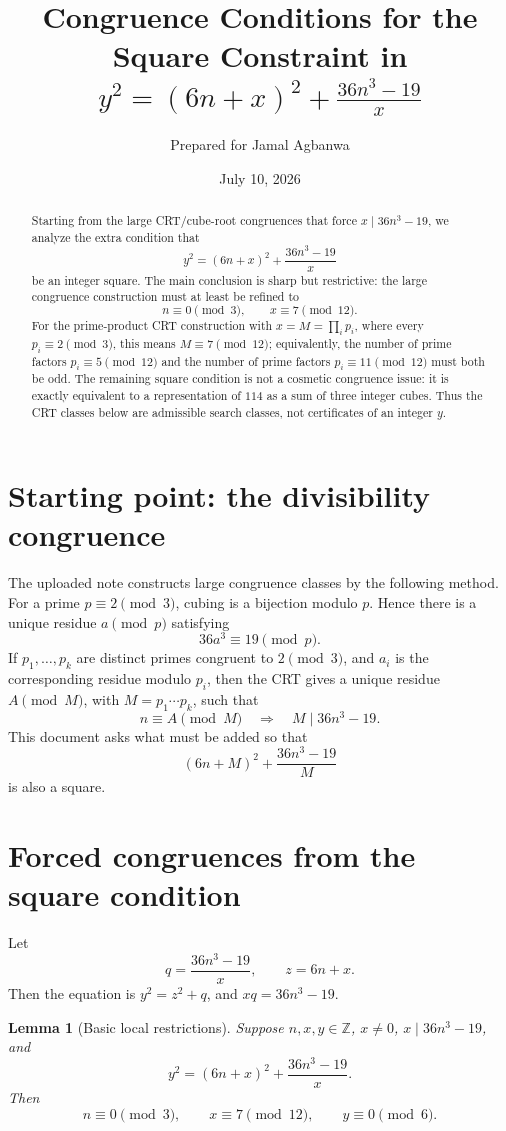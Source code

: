 \documentclass[11pt]{article}
\title{Congruence Conditions for the Square Constraint in\\
\texorpdfstring{$\displaystyle y^2=(6n+x)^2+\frac{36n^3-19}{x}$}{y2=(6n+x)2+(36n3-19)/x}}
\author{Prepared for Jamal Agbanwa}
\date{July 10, 2026}
\newtheorem{lemma}{Lemma}
\newcommand{\Z}{\mathbb Z}
\begin{document}
\maketitle

\begin{abstract}
Starting from the large CRT/cube-root congruences that force
\(x\mid 36n^3-19\), we analyze the extra condition that
\[
        y^2=(6n+x)^2+\frac{36n^3-19}{x}
\]
be an integer square.  The main conclusion is sharp but restrictive: the
large congruence construction must at least be refined to
\[
        n\equiv 0 \pmod 3,\qquad x\equiv 7 \pmod {12}.
\]
For the prime-product CRT construction with \(x=M=\prod_i p_i\), where every
\(p_i\equiv 2\pmod 3\), this means \(M\equiv 7\pmod {12}\); equivalently, the
number of prime factors \(p_i\equiv 5\pmod {12}\) and the number of prime
factors \(p_i\equiv 11\pmod {12}\) must both be odd.  The remaining square
condition is not a cosmetic congruence issue: it is exactly equivalent to a
representation of \(114\) as a sum of three integer cubes.  Thus the CRT
classes below are admissible search classes, not certificates of an integer
\(y\).
\end{abstract}

\section{Starting point: the divisibility congruence}
The uploaded note constructs large congruence classes by the following method.
For a prime \(p\equiv 2\pmod 3\), cubing is a bijection modulo \(p\). Hence
there is a unique residue \(a\pmod p\) satisfying
\[
        36a^3\equiv 19\pmod p.
\]
If \(p_1,\dots,p_k\) are distinct primes congruent to \(2\pmod 3\), and
\(a_i\) is the corresponding residue modulo \(p_i\), then the CRT gives a
unique residue \(A\pmod M\), with \(M=p_1\cdots p_k\), such that
\[
        n\equiv A\pmod M
        \quad\Longrightarrow\quad
        M\mid 36n^3-19.
\]
This document asks what must be added so that
\[
        (6n+M)^2+\frac{36n^3-19}{M}
\]
is also a square.

\section{Forced congruences from the square condition}
Let
\[
        q=\frac{36n^3-19}{x},\qquad z=6n+x.
\]
Then the equation is \(y^2=z^2+q\), and \(xq=36n^3-19\).

\begin{lemma}[Basic local restrictions]\label{lem:basic}
Suppose \(n,x,y\in\Z\), \(x\ne 0\), \(x\mid 36n^3-19\), and
\[
        y^2=(6n+x)^2+\frac{36n^3-19}{x}.
\]
Then
\[
        n\equiv 0\pmod 3,
        \qquad x\equiv 7\pmod {12},
        \qquad y\equiv 0\pmod 6.
\]
\end{lemma}
\end{document}
